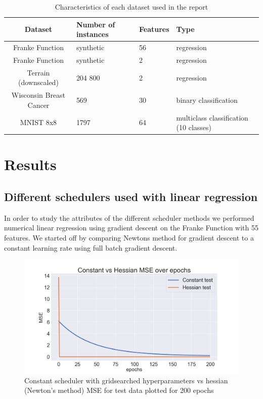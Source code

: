\documentclass[onecolumn,10pt,cleanfoot]{asme2ej}
\begin{document}
\begin{table}[h]
\caption{Characteristics of each dataset used in the report}
\begin{center}
\label{datasettable}
\begin{tabular}{| c | l | l | l |}
\hline
Dataset & Number of instances & Features & Type \\
\hline
Franke Function & synthetic & 56 & regression \\
Franke Function & synthetic & 2 & regression \\
Terrain (downscaled) & 204 800 & 2 & regression \\
Wisconsin Breast Cancer & 569 & 30 & binary classification \\
MNIST 8x8 & 1797 & 64 & multiclass classification (10 classes) \\
\hline
\end{tabular}
\end{center}
\end{table}

\section{Results}

\subsection{Different schedulers used with linear regression}

In order to study the attributes of the different scheduler methods we performed numerical linear regression using gradient descent on the Franke Function with 55 features. We started off by comparing Newtons method for gradient descent to a constant learning rate using full batch gradient descent.

\begin{figure}[h]
\centerline{\includegraphics[width=5in]{figure/constant_v_hessian.png}}
\caption{Constant scheduler with gridsearched hyperparameters vs hessian (Newton's method) MSE for test data plotted for 200 epochs}
\label{constant_v_hessian}
\end{figure}
\end{document}
